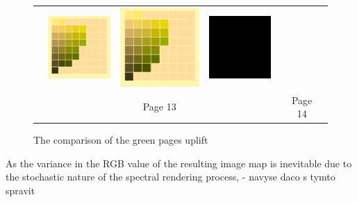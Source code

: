 \begin{figure}[t!]
{\begin{tabular}{ccccccc}
			&\quad
			\includegraphics[width=.155\linewidth]{img/results_uplift_page14_originalFL11.png}
			&
			\includegraphics[width=.155\linewidth]{img/results_uplift_page14_ourFL11.png}
			&
			\includegraphics[width=.155\linewidth]{img/toDelete.png}\\
			& & Page 13 & & & Page 14 & \\
		\end{tabular}
	}
	\caption{The comparison of the green pages uplift}
	\label{fig:results_uplift_munsell_green_pages}
\end{figure}


 As the variance in the RGB value of the resulting image map is inevitable due to the stochastic nature of the spectral rendering process, - navyse daco s tymto spravit


